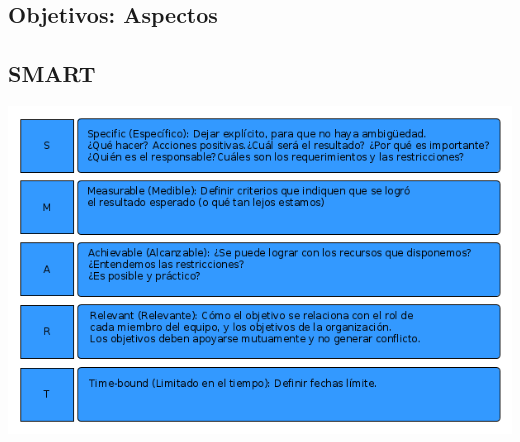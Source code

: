 \documentclass[portrait,a0paper,fontscale=0.277]{baposter}
\newcommand{\compresslist}{%
\setlength{\topsep}{0pt}%
\setlength{\itemsep}{0pt}%
\setlength{\parskip}{0pt}%
\setlength{\parsep}{0pt}%
}
\begin{document}
\begin{poster}
{\section*{Objetivos: Aspectos}

%

\subsection*{SMART}
\begin{center}	
		\includegraphics[width=1\linewidth]{smart}
\end{center}

}
\end{poster}
\end{document}

